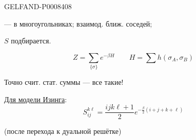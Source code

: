 \begin{GelfandAdjacentEvidence}{GELFAND-P000840}{8}


  — в многоугольниках; взаимод. ближ. соседей;

\(S\) подбирается.
\end{GelfandAdjacentEvidence}


\[
Z=\sum_{\{\sigma\}}e^{-\beta H}
\qquad H=\sum h(\sigma_A,\sigma_B)
\]

Точно счит. стат. суммы — все такие!

\uline{Для модели Изинга}:
\[
S_{ij}^{k\ell}=\frac{ijk\ell+1}{2}e^{-\frac{\beta}{2}(i+j+k+\ell)}
\]

(после перехода к дуальной решётке)


